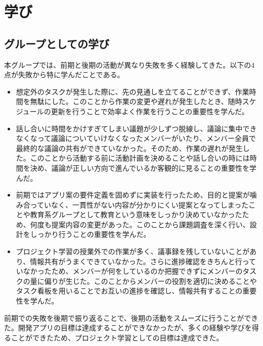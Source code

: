 \documentclass[openany,11pt,papersize]{jsbook}
\begin{document}



\chapter{学び}
\section{グループとしての学び}
本グループでは、前期と後期の活動が異なり失敗を多く経験してきた。以下の4点が失敗から特に学んだことである。
\begin{itemize}
\item 
想定外のタスクが発生した際に、先の見通しを立てることができず、作業時間を無駄にした。このことから作業の変更や遅れが発生したとき、随時スケジュールの更新を行うことで効率よく作業を行うことの重要性を学んだ。

\item 
話し合いに時間をかけすぎてしまい議題が少しずつ脱線し、議論に集中できなくなって議論についていけなくなったメンバーがいたり、メンバー全員で最終的な議論の共有ができていなかった。そのため、作業の遅れが発生した。このことから活動する前に活動計画を決めることや話し合いの時には時間を決め、議論が正しい方向で進んでいるか客観的に見ることの重要性を学んだ。

\item
前期ではアプリ案の要件定義を固めずに実装を行ったため、目的と提案が噛み合っていなく、一貫性がない内容が分かりにくい提案となってしまったことや教育系グループとして教育という意味をしっかり決めていなかったため、何度も提案内容の変更があった。このことから課題調査を深く行い、設計をしっかり行うことの重要性を学んだ。

\item
プロジェクト学習の授業外での作業が多く、議事録を残していないことがあり、情報共有がうまくできていなかった。さらに進捗確認をきちんと行っていなかったため、メンバーが何をしているのか把握できずにメンバーのタスクの量に偏りが生じた。このことからメンバーの役割を適切に決めることやタスク看板を用いることでお互いの進捗を確認し、情報共有することの重要性を学んだ。

\end{itemize}
\par
前期での失敗を後期で振り返ることで、後期の活動をスムーズに行うことができた。開発アプリの目標は達成することができなかったが、多くの経験や学びを得ることができたため、プロジェクト学習としての目標は達成できた。

\end{document}
